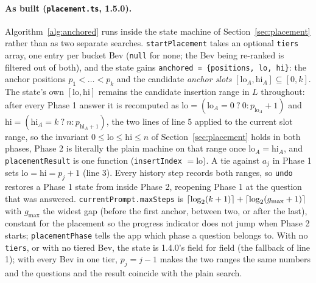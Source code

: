 \documentclass[11pt]{article}
\DeclarePairedDelimiter\ceil{\lceil}{\rceil}
\newcommand{\code}[1]{\texttt{#1}}
\theoremstyle{plain}
\theoremstyle{definition}
\theoremstyle{remark}
\begin{document}
\paragraph{As built (\code{placement.ts}, 1.5.0).} Algorithm~\ref{alg:anchored} runs inside the state machine of Section~\ref{sec:placement} rather than as two separate searches. \code{startPlacement} takes an optional \code{tiers} array, one entry per bucket Bev (\code{null} for none; the Bev being re-ranked is filtered out of both), and the state gains \code{anchored = \{positions, lo, hi\}}: the anchor positions $p_1 < \dots < p_k$ and the candidate \emph{anchor slots} $[\mathrm{lo}_A, \mathrm{hi}_A] \subseteq [0, k]$. The state's own $[\mathrm{lo}, \mathrm{hi}]$ remains the candidate insertion range in $L$ throughout: after every Phase 1 answer it is recomputed as $\mathrm{lo} = (\mathrm{lo}_A = 0\ ?\ 0 : p_{\mathrm{lo}_A} + 1)$ and $\mathrm{hi} = (\mathrm{hi}_A = k\ ?\ n : p_{\mathrm{hi}_A + 1})$, the two lines of line 5 applied to the current slot range, so the invariant $0 \le \mathrm{lo} \le \mathrm{hi} \le n$ of Section~\ref{sec:placement} holds in both phases, Phase 2 is literally the plain machine on that range once $\mathrm{lo}_A = \mathrm{hi}_A$, and \code{placementResult} is one function (\code{insertIndex} $= \mathrm{lo}$). A tie against $a_j$ in Phase 1 sets $\mathrm{lo} = \mathrm{hi} = p_j + 1$ (line 3). Every history step records both ranges, so \code{undo} restores a Phase 1 state from inside Phase 2, reopening Phase 1 at the question that was answered. \code{currentPrompt.maxSteps} is $\ceil{\log_2(k+1)} + \ceil{\log_2(g_{\max}+1)}$ with $g_{\max}$ the widest gap (before the first anchor, between two, or after the last), constant for the placement so the progress indicator does not jump when Phase 2 starts; \code{placementPhase} tells the app which phase a question belongs to. With no \code{tiers}, or with no tiered Bev, the state is 1.4.0's field for field (the fallback of line 1); with every Bev in one tier, $p_j = j - 1$ makes the two ranges the same numbers and the questions and the result coincide with the plain search.
\end{document}

